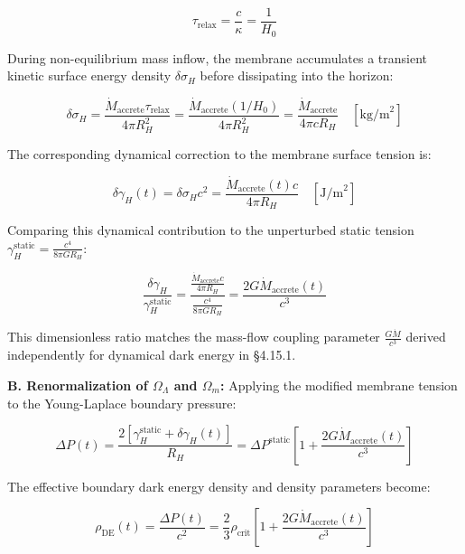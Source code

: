 \documentclass[11pt,a4paper]{article}
\theoremstyle{definition}\newtheorem{definition}{Definition}
\theoremstyle{remark}\newtheorem{remark}{Remark}
\begin{document}
\begin{equation}
\tau_{\text{relax}} = \frac{c}{\kappa} = \frac{1}{H_0}
\end{equation}


During non-equilibrium mass inflow, the membrane accumulates a transient kinetic surface energy density $\delta\sigma_H$ before dissipating into the horizon:


\begin{equation}
\delta\sigma_H = \frac{\dot{M}_{\text{accrete}} \tau_{\text{relax}}}{4\pi R_H^2} = \frac{\dot{M}_{\text{accrete}} (1/H_0)}{4\pi R_H^2} = \frac{\dot{M}_{\text{accrete}}}{4\pi c R_H} \quad [\text{kg/m}^2]
\end{equation}


The corresponding dynamical correction to the membrane surface tension is:


\begin{equation}
\delta\gamma_H(t) = \delta\sigma_H c^2 = \frac{\dot{M}_{\text{accrete}}(t) c}{4\pi R_H} \quad [\text{J/m}^2]
\end{equation}


Comparing this dynamical contribution to the unperturbed static tension $\gamma_H^{\text{static}} = \frac{c^4}{8\pi G R_H}$:


\begin{equation}
\boxed{\frac{\delta\gamma_H}{\gamma_H^{\text{static}}} = \frac{\frac{\dot{M}_{\text{accrete}} c}{4\pi R_H}}{\frac{c^4}{8\pi G R_H}} = \frac{2 G \dot{M}_{\text{accrete}}(t)}{c^3}}
\end{equation}


This dimensionless ratio matches the mass-flow coupling parameter $\frac{G \dot{M}}{c^3}$ derived independently for dynamical dark energy in §4.15.1.

\textbf{B. Renormalization of $\Omega_\Lambda$ and $\Omega_m$:}
Applying the modified membrane tension to the Young-Laplace boundary pressure:


\begin{equation}
\Delta P(t) = \frac{2 [\gamma_H^{\text{static}} + \delta\gamma_H(t)]}{R_H} = \Delta P^{\text{static}} \left[1 + \frac{2 G \dot{M}_{\text{accrete}}(t)}{c^3}\right]
\end{equation}


The effective boundary dark energy density and density parameters become:


\begin{equation}
\rho_{\text{DE}}(t) = \frac{\Delta P(t)}{c^2} = \frac{2}{3}\rho_{\text{crit}} \left[1 + \frac{2 G \dot{M}_{\text{accrete}}(t)}{c^3}\right]
\end{equation}
\end{document}
